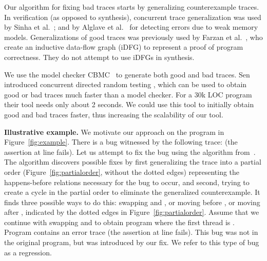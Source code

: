 \documentclass{llncs}
\begin{document}
Our algorithm for fixing bad traces starts by generalizing
counterexample traces.  
In verification (as opposed to synthesis), 
concurrent trace generalization was used by
Sinha et
al.\ \cite{Sinha:2011:IA:1926385.1926433,DBLP:conf/sigsoft/SinhaW10};
and by Alglave et
al.\ \cite{DBLP:conf/cav/AlglaveKT13} for detecting errors due to weak
memory models.
Generalizations of good traces was previously used by Farzan et
al.\ \cite{Farzan:2013:IDF:2480359.2429086}, who create an inductive
data-flow graph (iDFG) to represent a proof of program correctness. 
They do not attempt to use iDFGs in synthesis. 

We use the model checker CBMC~\cite{cbmc} to generate both good and bad
traces.
Sen introduced concurrent directed random testing
\cite{Sen:2008:RDR:1375581.1375584}, which can be used to obtain good
or bad traces much faster than a model checker.
For a 30k LOC program their tool needs only about 2
seconds. 
We could use this tool to initially obtain good and bad traces
faster, thus increasing the scalability of our tool. 





\noindent
{\bf Illustrative example.}
We motivate our approach on the program  in
Figure~\ref{fig:example}.    
There is a bug witnessed by the following trace:
 (the assertion at line  fails). 
Let us attempt to fix the bug using the algorithm from~\cite{cav2013}.
The algorithm discovers possible fixes by first generalizing the trace
into a partial order (Figure~\ref{fig:partialorder}, without the dotted 
edges) representing the happens-before relations necessary for the bug
to occur, and second, trying to create a cycle in the partial order to
eliminate the generalized counterexample.
It finds three possible ways to do this: swapping  and
, or moving  before , or moving  after , indicated by
the dotted edges in Figure~\ref{fig:partialorder}. 
Assume that we continue with swapping  and  to obtain program
 where the first thread is . 
Program  contains an error trace  (the assertion at line  fails). 
This bug was not in the original program, but was introduced
by our fix. 
We refer to this type of bug as a regression. 
\end{document}
